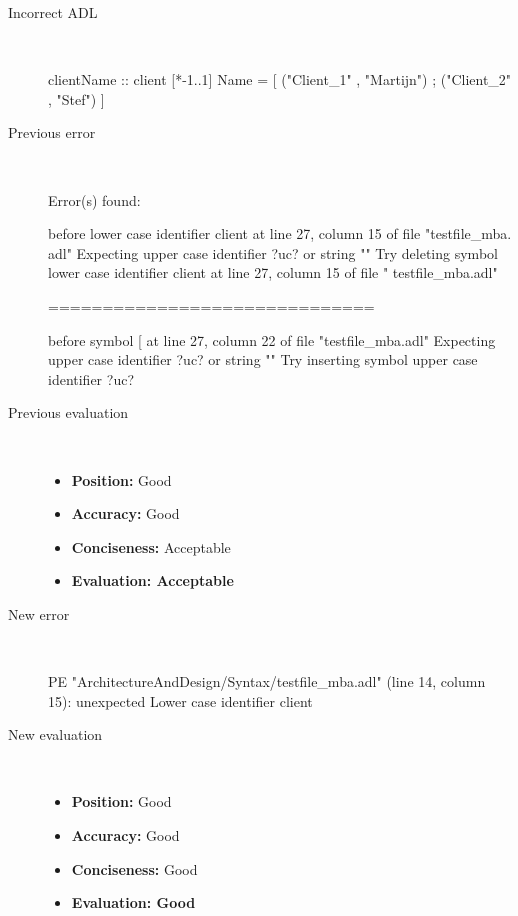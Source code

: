 \hrulefill

\begin{description}
  \item[Incorrect ADL]~\\
\begin{adl}
clientName :: client [*-1..1] Name =
    [ ("Client_1"      , "Martijn")
    ; ("Client_2"      , "Stef")
    ]\end{adl}
  \item[Previous error]~\\
\begin{haskell}
Error(s) found:

before lower case identifier client at line 27, column 15 of file "testfile_mba.
adl"
Expecting upper case identifier ?uc? or string ""
Try deleting symbol lower case identifier client at line 27, column 15 of file "
testfile_mba.adl"

==============================

before symbol [ at line 27, column 22 of file "testfile_mba.adl"
Expecting upper case identifier ?uc? or string ""
Try inserting symbol upper case identifier ?uc?\end{haskell}
  \item[Previous evaluation]~\\
    \begin{itemize}
    \item \textbf{Position:} Good
    \item \textbf{Accuracy:} Good
    \item \textbf{Conciseness:} Acceptable
    \item \textbf{Evaluation: Acceptable}
    \end{itemize}
  \item[New error]~\\
\begin{haskell}
PE "ArchitectureAndDesign/Syntax/testfile_mba.adl" (line 14, column 15):
unexpected Lower case identifier client\end{haskell}
  \item[New evaluation]~\\
    \begin{itemize}
    \item \textbf{Position:} Good
    \item \textbf{Accuracy:} Good
    \item \textbf{Conciseness:} Good
    \item \textbf{Evaluation: Good}
    \end{itemize}
  \end{description}

